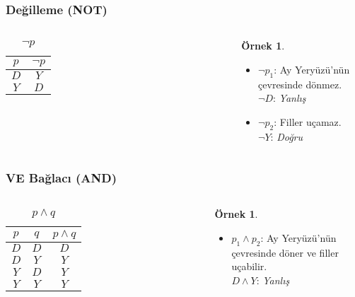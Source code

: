 \documentclass[dvipsnames]{beamer}
\theoremstyle{definition}
\theoremstyle{example}
\newtheorem{ornek}[theorem]{Örnek}
\theoremstyle{plain}
\begin{document}
\begin{frame}
  \frametitle{Değilleme (NOT)}

  \begin{columns}
    \begin{table}
      \caption{$\neg p$}
      \begin{tabular}{|c||c|}\hline
        $p$ & $\neg p$\\\hline\hline
        $D$ & $Y$\\\hline
        $Y$ & $D$\\\hline
      \end{tabular}
    \end{table}

    \pause
    \begin{ornek}
      \begin{itemize}
        \item $\neg p_1$: Ay Yeryüzü'nün çevresinde dönmez.\\
          $\neg D$: \emph{Yanlış}
        \item $\neg p_2$: Filler uçamaz.\\
          $\neg Y$: \emph{Doğru}
      \end{itemize}
    \end{ornek}
  \end{columns}
\end{frame}

\begin{frame}
  \frametitle{VE Bağlacı (AND)}

  \begin{columns}
    \begin{table}
      \caption{$p \wedge q$}
      \begin{tabular}{|c|c||c|}\hline
        $p$ & $q$ & $p \wedge q$\\\hline\hline
        $D$ & $D$ & $D$\\\hline
        $D$ & $Y$ & $Y$\\\hline
        $Y$ & $D$ & $Y$\\\hline
        $Y$ & $Y$ & $Y$\\\hline
      \end{tabular}
    \end{table}

    \pause
    \begin{ornek}
      \begin{itemize}
        \item $p_1 \wedge p_2$: Ay Yeryüzü'nün çevresinde döner ve filler
          uçabilir.\\
          $D \wedge Y$: \emph{Yanlış}
      \end{itemize}
    \end{ornek}
  \end{columns}
\end{frame}
\end{document}
